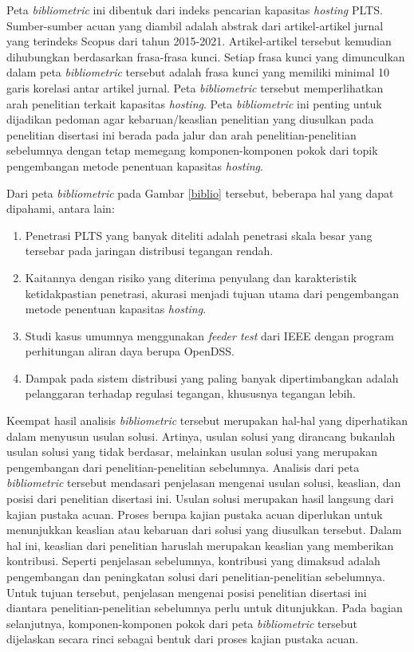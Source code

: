 Peta \textit{bibliometric} ini dibentuk dari indeks pencarian kapasitas \textit{hosting} PLTS. Sumber-sumber acuan yang diambil adalah abstrak dari artikel-artikel jurnal yang terindeks Scopus dari tahun 2015-2021. Artikel-artikel tersebut kemudian dihubungkan berdasarkan frasa-frasa kunci. Setiap frasa kunci yang dimunculkan dalam peta \textit{bibliometric} tersebut adalah frasa kunci yang memiliki minimal 10 garis korelasi antar artikel jurnal. Peta \textit{bibliometric} tersebut memperlihatkan arah penelitian terkait kapasitas \textit{hosting}. Peta \textit{bibliometric} ini penting untuk dijadikan pedoman agar kebaruan/keaslian penelitian yang diusulkan pada penelitian disertasi ini berada pada jalur dan arah penelitian-penelitian sebelumnya dengan tetap memegang komponen-komponen pokok dari topik pengembangan metode penentuan kapasitas \textit{hosting}. 

Dari peta \textit{bibliometric} pada Gambar \ref{biblio} tersebut, beberapa hal yang dapat dipahami, antara lain:
\begin{enumerate}
	\item Penetrasi PLTS yang banyak diteliti adalah penetrasi skala besar yang tersebar pada jaringan distribusi tegangan rendah. 
	\item Kaitannya dengan risiko yang diterima penyulang dan karakteristik ketidakpastian penetrasi, akurasi menjadi tujuan utama dari pengembangan metode penentuan kapasitas \textit{hosting}.
	\item Studi kasus umumnya menggunakan \textit{feeder test} dari IEEE dengan program perhitungan aliran daya berupa OpenDSS.
	\item Dampak pada sistem distribusi yang paling banyak dipertimbangkan adalah pelanggaran terhadap regulasi tegangan, khususnya tegangan lebih.
\end{enumerate}

Keempat hasil analisis \textit{bibliometric} tersebut merupakan hal-hal yang diperhatikan dalam menyusun usulan solusi. Artinya, usulan solusi yang dirancang bukanlah usulan solusi yang tidak berdasar, melainkan usulan solusi yang merupakan pengembangan dari penelitian-penelitian sebelumnya. Analisis dari peta \textit{bibliometric} tersebut mendasari penjelasan mengenai usulan solusi, keaslian, dan posisi dari penelitian disertasi ini. Usulan solusi merupakan hasil langsung dari kajian pustaka acuan. Proses berupa kajian pustaka acuan diperlukan untuk menunjukkan keaslian atau kebaruan dari solusi yang diusulkan tersebut. Dalam hal ini, keaslian dari penelitian haruslah merupakan keaslian yang memberikan kontribusi. Seperti penjelasan sebelumnya, kontribusi yang dimaksud adalah pengembangan dan peningkatan solusi dari penelitian-penelitian sebelumnya. Untuk tujuan tersebut, penjelasan mengenai posisi penelitian disertasi ini diantara penelitian-penelitian sebelumnya perlu untuk ditunjukkan. Pada bagian selanjutnya, komponen-komponen pokok dari peta \textit{bibliometric} tersebut dijelaskan secara rinci sebagai bentuk dari proses kajian pustaka acuan. 

